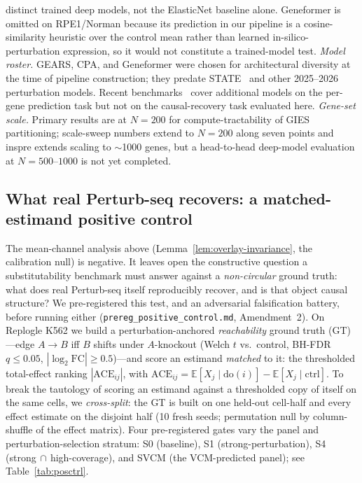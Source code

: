 \documentclass{article}
\theoremstyle{plain}
\theoremstyle{definition}
\theoremstyle{remark}
\begin{document}
distinct trained deep models, not the ElasticNet baseline alone. Geneformer is omitted on RPE1/Norman because its prediction in our pipeline is a cosine-similarity heuristic over the control mean rather than learned in-silico-perturbation expression, so it would not constitute a trained-model test. \textit{Model roster.} GEARS, CPA, and Geneformer were chosen for architectural diversity at the time of pipeline construction; they predate STATE~\citep{adduri2025state,arc2025state} and other 2025--2026 perturbation models. Recent benchmarks~\citep{wong2025simple,csendes2025benchmark,wei2025benchmark,vinas2025systema} cover additional models on the per-gene prediction task but not on the causal-recovery task evaluated here. \textit{Gene-set scale.} Primary results are at $N=200$ for compute-tractability of GIES partitioning; scale-sweep numbers extend to $N=200$ along seven points and inspre extends scaling to $\sim$1000 genes, but a head-to-head deep-model evaluation at $N=500$--$1000$ is not yet completed.

\subsection{What real Perturb-seq recovers: a matched-estimand positive control}
\label{sec:a3-localization}
The mean-channel analysis above (Lemma~\ref{lem:overlay-invariance}, the calibration null) is negative. It leaves open the constructive question a substitutability benchmark must answer against a \emph{non-circular} ground truth: what does real Perturb-seq itself reproducibly recover, and is that object causal structure? We pre-registered this test, and an adversarial falsification battery, before running either (\texttt{prereg\_positive\_control.md}, Amendment~2). On Replogle K562 we build a perturbation-anchored \emph{reachability} ground truth (GT)---edge $A\to B$ iff $B$ shifts under $A$-knockout (Welch $t$ vs.\ control, BH-FDR $q\le0.05$, $|\log_2\mathrm{FC}|\ge0.5$)---and score an estimand \emph{matched} to it: the thresholded total-effect ranking $|\mathrm{ACE}_{ij}|$, with $\mathrm{ACE}_{ij}=\mathbb{E}[X_j\mid\mathrm{do}(i)]-\mathbb{E}[X_j\mid\mathrm{ctrl}]$. To break the tautology of scoring an estimand against a thresholded copy of itself on the same cells, we \emph{cross-split}: the GT is built on one held-out cell-half and every effect estimate on the disjoint half (10 fresh seeds; permutation null by column-shuffle of the effect matrix). Four pre-registered gates vary the panel and perturbation-selection stratum: S0 (baseline), S1 (strong-perturbation), S4 (strong$\,\cap\,$high-coverage), and SVCM (the VCM-predicted panel); see Table~\ref{tab:posctrl}.
\end{document}
